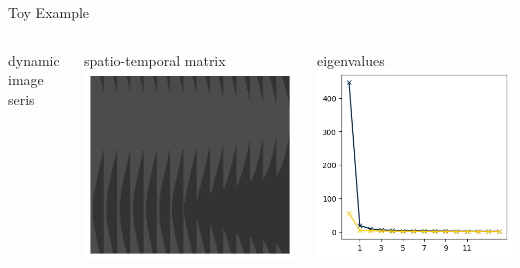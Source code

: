 \documentclass[aspectratio=169]{beamer}
\begin{document}
	\begin{frame}{Toy Example}
		\begin{columns}
			\centering
			dynamic image seris
			\vspace{1em}
			
			\centering
			spatio-temporal matrix
			\vspace{1em}
			\includegraphics[height=0.5\textheight]{figures/dyn_phan/spatio-temporal-matrix.png}
			
			\centering
			eigenvalues
			\vspace{1em}
			\includegraphics[height=0.5\textheight]{figures/dyn_phan/svd.png}
		\end{columns}
	\end{frame}
	
\end{document}
